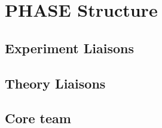 \section{PHASE Structure}

\subsection{Experiment Liaisons}
\subsection{Theory Liaisons}
\subsection{Core team}